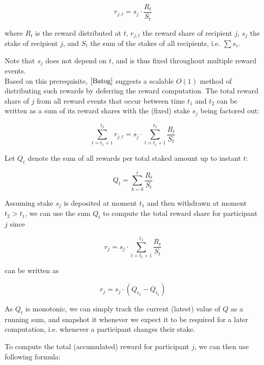 \documentclass[reqno]{article}
\begin{document}
\begin{equation} 
    r_{j,t}=s_j \cdot \frac{R_t}{S_t}
\end{equation}

where $R_t$ is the reward distributed at $t$, $r_{j,t}$ the reward share of recipient $j$, $s_j$ the stake of recipient $j$, and $S_t$ the sum of the stakes of all recipients, i.e. $\sum s_i$.

Note that $s_j$ does not depend on $t$, and is thus fixed throughout multiple reward events.  \\

Based on this prerequisite, $\cite{Batog}$ suggests a scalable $O(1)$ method of distributing such rewards by deferring the reward computation. The total reward share of $j$ from all reward events that occur between time $t_1$ and $t_2$ can be written as a sum of its reward shares with the (fixed) stake $s_j$ being factored out:

\begin{equation}
    \sum\limits_{t=t_1+1}^{t_2} r_{j,t} = s_j \cdot \sum\limits_{t=t_1+1}^{t_2}\frac{R_t}{S_t}
\end{equation}

Let $Q_t$ denote the sum of all rewards per total staked amount up to instant $t$:

\begin{equation}
   Q_t = \sum\limits_{k=0}^{t}\frac{R_t}{S_t}
\end{equation}

Assuming stake $s_j$ is deposited at moment $t_1$ and then
withdrawn at moment $t_2 > t_1$, we can use the sum $Q_t$ to
compute the total reward share for participant $j$ since


\begin{equation} 
    r_j = s_j \cdot \sum\limits_{t=t_1+1}^{t_2}\frac{R_t}{S_t}
\end{equation}

can be written as

\begin{equation} 
    r_j = s_j \cdot (Q_{t_2} - Q_{t_1})
\end{equation}

As $Q_t$ is monotonic, we can simply track the current (latest)
value of $Q$ as a running sum, and snapshot it whenever we expect it to be required for a later computation, i.e. whenever a participant changes their stake.

To compute the total (accumulated) reward for participant $j$, we can then use following formula:
\end{document}
